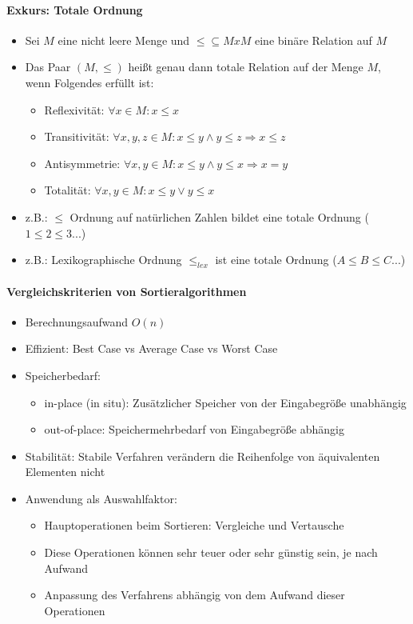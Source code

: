 \paragraph{Exkurs: Totale Ordnung}
    \begin{itemize}
        \item Sei $M$ eine nicht leere Menge und $\leq \subseteq MxM$ eine binäre Relation auf $M$
        \item Das Paar $(M, \leq)$ heißt genau dann totale Relation auf der Menge $M$, wenn Folgendes erfüllt ist:
            \begin{itemize}
                \item Reflexivität: $\forall x \in M: x \leq x$
                \item Transitivität: $\forall x,y,z \in M: x \leq y \land y \leq z \Rightarrow x \leq z$
                \item Antisymmetrie: $\forall x,y \in M: x \leq y \land y \leq x \Rightarrow x = y$
                \item Totalität: $\forall x,y \in M: x \leq y \lor y \leq x$
            \end{itemize}
        \item z.B.: $\leq$ Ordnung auf natürlichen Zahlen bildet eine totale Ordnung ($1 \leq 2 \leq 3 ...$)
        \item z.B.: Lexikographische Ordnung $\leq_{lex}$ ist eine totale Ordnung ($A \leq B \leq C ...$)
    \end{itemize}

\paragraph{Vergleichskriterien von Sortieralgorithmen}
    \begin{itemize}
        \item Berechnungsaufwand $O(n)$
        \item Effizient: Best Case vs Average Case vs Worst Case
        \item Speicherbedarf:
            \begin{itemize}
                \item in-place (in situ): Zusätzlicher Speicher von der Eingabegröße unabhängig
                \item out-of-place: Speichermehrbedarf von Eingabegröße abhängig
            \end{itemize}
        \item Stabilität: Stabile Verfahren verändern die Reihenfolge von äquivalenten Elementen nicht
        \item Anwendung als Auswahlfaktor: 
            \begin{itemize}
                \item Hauptoperationen beim Sortieren: Vergleiche und Vertausche
                \item Diese Operationen können sehr teuer oder sehr günstig sein, je nach Aufwand
                \item Anpassung des Verfahrens abhängig von dem Aufwand dieser Operationen
            \end{itemize}    
    \end{itemize}

